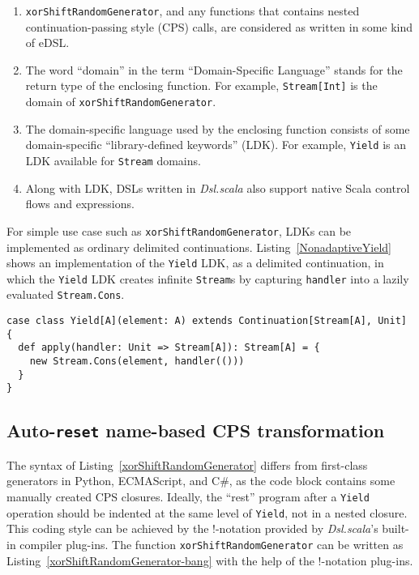 \begin{enumerate}
  \item \lstinline{xorShiftRandomGenerator}, and any functions that contains nested continuation-passing style (CPS) calls, are considered as written in some kind of eDSL.
  \item The word ``domain'' in the term ``Domain-Specific Language'' stands for the return type of the enclosing function. For example, \lstinline{Stream[Int]} is the domain of \lstinline{xorShiftRandomGenerator}.
  \item The domain-specific language used by the enclosing function consists of some domain-specific ``library-defined keywords'' (LDK). For example, \lstinline{Yield} is an LDK available for \lstinline{Stream} domains.
  \item Along with LDK, DSLs written in \textit{Dsl.scala} also support native Scala control flows and expressions.
\end{enumerate}

For simple use case such as \lstinline{xorShiftRandomGenerator}, LDKs can be implemented as ordinary delimited continuations. Listing~\ref{NonadaptiveYield} shows an implementation of the \lstinline{Yield} LDK, as a delimited continuation, in which the \lstinline{Yield} LDK creates infinite \lstinline{Stream}s by capturing \lstinline{handler} into a lazily evaluated \lstinline{Stream.Cons}.

\begin{lstlisting}[caption={Implementing \lstinline{Yield} LDK as ordinary delimited continuations},label={NonadaptiveYield}]
case class Yield[A](element: A) extends Continuation[Stream[A], Unit] {
  def apply(handler: Unit => Stream[A]): Stream[A] = {
    new Stream.Cons(element, handler(()))
  }
}
\end{lstlisting}

\subsection{Auto-\lstinline{reset} name-based CPS transformation}\label{CPS transformation}

The syntax of Listing~\ref{xorShiftRandomGenerator} differs from first-class generators in Python, ECMAScript, and C\#, as the code block contains some manually created CPS closures. Ideally, the ``rest'' program after a \lstinline{Yield} operation should be indented at the same level of \lstinline{Yield}, not in a nested closure. This coding style can be achieved by the !-notation provided by \textit{Dsl.scala}'s built-in compiler plug-ins. The function \lstinline{xorShiftRandomGenerator} can be written as Listing~\ref{xorShiftRandomGenerator-bang} with the help of the !-notation plug-ins.

